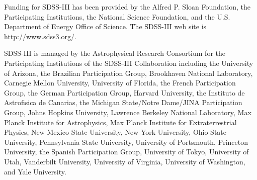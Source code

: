 \documentclass[fleqn,usenatbib]{mnras}
\begin{document}
Funding for SDSS-III has been provided by the Alfred P. Sloan Foundation, the
Participating Institutions, the National Science Foundation, and the U.S.
Department of Energy Office of Science. The SDSS-III web site is
http://www.sdss3.org/.

SDSS-III is managed by the Astrophysical Research Consortium for the
Participating Institutions of the SDSS-III Collaboration including the
University of Arizona, the Brazilian Participation Group, Brookhaven National
Laboratory, Carnegie Mellon University, University of Florida, the French
Participation Group, the German Participation Group, Harvard University, the
Instituto de Astrofisica de Canarias, the Michigan State/Notre Dame/JINA
Participation Group, Johns Hopkins University, Lawrence Berkeley National
Laboratory, Max Planck Institute for Astrophysics, Max Planck Institute for
Extraterrestrial Physics, New Mexico State University, New York University,
Ohio State University, Pennsylvania State University, University of Portsmouth,
Princeton University, the Spanish Participation Group, University of Tokyo,
University of Utah, Vanderbilt University, University of Virginia, University
of Washington, and Yale University.

\footnotesize{


}

\bsp	%
\label{lastpage}
\end{document}
